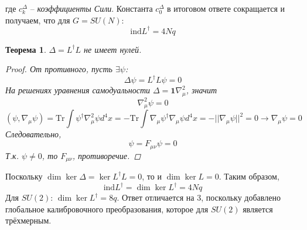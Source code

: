 \documentclass[12pt]{article}
\newtheorem{theorem}{Теорема}[section]
\theoremstyle{definition}
\begin{document}
где $c_k^\Delta$ -- \textit{коэффициенты Сили}. Константа $c^\Delta_0$ в итоговом ответе сокращается и получаем, что для $G=SU(N)$:
\begin{equation}
    \text{ind}L^\dagger=4Nq
\end{equation}
\begin{theorem}
    $\Delta=L^\dagger L$ не имеет нулей.
    \begin{proof}
        От противного, пусть $\exists\psi$:
        \begin{equation}
            \Delta\psi=L^\dagger L\psi=0
        \end{equation}
        На решениях уравнения самодуальности $\Delta=\bm{1}\nabla_\mu^2$, значит
        \begin{equation}
            \nabla_\mu^2\psi=0
        \end{equation}
        \begin{equation}
            (\psi,\nabla_\mu\psi)=\text{Tr}\int\psi^\dagger\nabla^2_\mu\psi d^4x=-\text{Tr}\int\nabla_\mu\psi^\dagger\nabla_\mu\psi d^4x=-||\nabla_\mu\psi||^2=0\rightarrow\nabla_\mu\psi=0
        \end{equation}
        Следовательно,
        \begin{equation}
            [\nabla_\mu,\nabla_\nu]\psi=F_{\mu\nu}\psi=0
        \end{equation}
        Т.к. $\psi\neq0$, то $F_{\mu\nu}$, противоречие.
    \end{proof}
\end{theorem}
Поскольку $\dim\ker\Delta=\ker L^\dagger L=0$, то и $\dim\ker L=0$. Таким образом,
\begin{equation}
    \text{ind}L^\dagger=\dim\ker L^\dagger=4Nq
\end{equation}
Для $SU(2)$: $\dim\ker L^\dagger=8q$. Ответ отличается на 3, поскольку добавлено глобальное калибровочного преобразования, которое для $SU(2)$ является трёхмерным.
\end{document}
